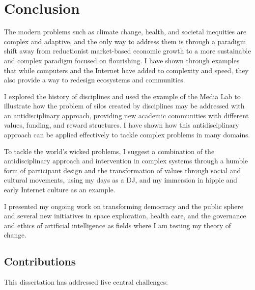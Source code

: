 \chapter{Conclusion}
\label{chap:conclusion}
The modern problems such as climate change, health, and societal inequities are complex and adaptive, and the only way to address them is through a paradigm shift away from reductionist market-based economic growth to a more sustainable and complex paradigm focused on flourishing. I have shown through examples that while computers and the Internet have added to complexity and speed, they also provide a way to redesign ecosystems and communities.

I explored the history of disciplines and used the example of the Media Lab to illustrate how the problem of silos created by disciplines may be addressed with an antidisciplinary approach, providing new academic communities with different values, funding, and reward structures. I have shown how this antidisciplinary approach can be applied effectively to tackle complex problems in many domains.

To tackle the world's wicked problems, I suggest a combination of the antidisciplinary approach and intervention in complex systems through a humble form of participant design and the transformation of values through social and cultural movements, using my days as a DJ, and my immersion in hippie and early Internet culture as an example.

I presented my ongoing work on transforming democracy and the public sphere and several new initiatives in space exploration, health care, and the governance and ethics of artificial intelligence as fields where I am testing my theory of change.

\section{Contributions}

This dissertation has addressed five central challenges: 


